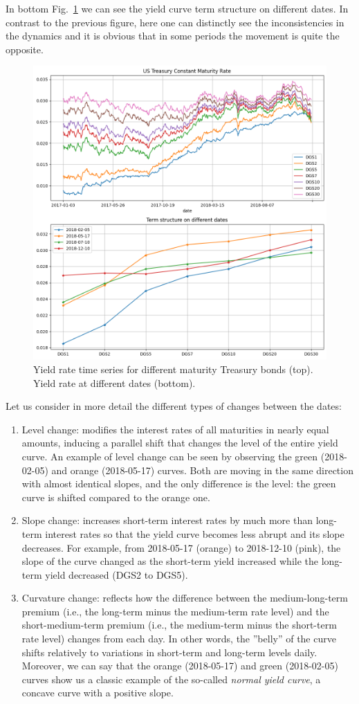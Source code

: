 In bottom Fig.~\ref{fig:yield_rate_ts} we can see the yield curve term structure on different dates. In contrast to the previous figure, here one can distinctly see the inconsistencies in the dynamics and it is obvious that in some periods the movement is quite the opposite.

\begin{figure}[htb]
	\centering
	\includegraphics[width=0.7\linewidth]{figures/treasury_rate}
	\caption{Yield rate time series for different maturity Treasury bonds (top). Yield rate at different dates (bottom).}
	\label{fig:yield_rate_ts}
\end{figure}

Let us consider in more detail the different types of changes between the dates:
\begin{enumerate}
\item Level change: modifies the interest rates of all maturities in nearly equal amounts, inducing a parallel shift that changes the level of the entire yield curve. An example of level change can be seen by observing the green (2018-02-05) and orange (2018-05-17) curves. Both are moving in the same direction with almost identical slopes, and the only difference is the level: the green curve is shifted compared to the orange one.
\item Slope change: increases short-term interest rates by much more than long-term interest rates so that the yield curve becomes less abrupt and its slope decreases.
For example, from 2018-05-17 (orange) to 2018-12-10 (pink), the slope of the curve changed as the short-term yield increased while the long-term yield decreased (DGS2 to DGS5).
\item Curvature change: reflects how the difference between the medium-long-term premium (i.e., the long-term minus the medium-term rate level) and the short-medium-term premium (i.e., the medium-term minus the short-term rate level) changes from each day. In other words, the ”belly” of the curve shifts relatively to variations in short-term and long-term levels daily. Moreover, we can say that the orange (2018-05-17) and green (2018-02-05) curves show us a classic example of the so-called \emph{normal yield curve}, a concave curve with a positive slope.
\end{enumerate}

